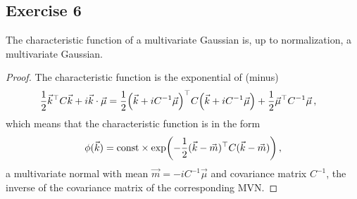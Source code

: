 \documentclass[main.tex]{subfiles}
\begin{document}
\subsection{Exercise 6}

\begin{claim}
The characteristic function of a multivariate Gaussian is, up to normalization, a multivariate Gaussian. 
\end{claim}

\begin{proof}
The characteristic function is the exponential of (minus) 
%
\begin{align}
\frac{1}{2} \vec{k}^{\top} C \vec{k} + i \vec{k} \cdot \vec{\mu} 
&=  \frac{1}{2} \qty(\vec{k} + i C^{-1} \vec{\mu })^{\top} C 
\qty(\vec{k} + iC^{-1}\vec{\mu }) + \frac{1}{2} \vec{\mu }^{\top} C^{-1} \vec{\mu }  
\,,
\end{align}
%
which means that the characteristic function is in the form 
%
\begin{align}
\phi (\vec{k}) = \text{const} \times \exp(- \frac{1}{2} (\vec{k} -\vec{m})^{\top} C (\vec{k} - \vec{m}) )
\,,
\end{align}
%
a multivariate normal with mean \(\vec{m} = -i C^{-1} \vec{\mu}\) and covariance matrix \(C^{-1}\), the inverse of the covariance matrix of the corresponding MVN.  
\end{proof}
\end{document}
